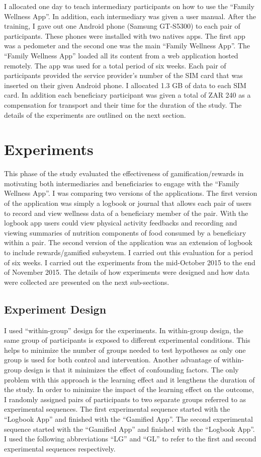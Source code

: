 I allocated one day to teach intermediary participants on how to use the ``Family Wellness App''. In addition, each intermediary was given a user manual. After the training, I gave out one Android phone (Samsung GT-S5300) to each pair of participants. These phones were installed with two natives apps. The first app was a pedometer and the second one was the main ``Family Wellness App''. The ``Family Wellness App'' loaded all its content from a web application hosted remotely. The app was used for a total period of six weeks. Each pair of participants provided the service provider's number of the SIM card that was inserted on their given Android phone. I allocated 1.3 GB of data to each SIM card. In addition each beneficiary participant was given a total of ZAR 240 as a compensation for transport and their time for the duration of the study. The details of the experiments are outlined on the next section.

\section{Experiments}
This phase of the study evaluated the effectiveness of gamification/rewards in motivating both intermediaries and beneficiaries to engage with the ``Family Wellness App''. I was comparing two versions of the applications. The first version of the application was simply a logbook or journal that allows each pair of users to record and view wellness data of a beneficiary member of the pair. With the logbook app users could view physical activity feedbacks and recording and viewing summaries of nutrition components of food consumed by a beneficiary within a pair. The second version of the application was an extension of logbook to include rewards/gamified subsystem. I carried out this evaluation for a period of six weeks. I carried out the experiments from the mid-October 2015 to the end of November 2015.  The details of how experiments were designed and how data were collected are presented on the next sub-sections.
\subsection{Experiment Design}
I used ``within-group'' design for the experiments. In within-group design, the same group of participants is exposed to different experimental conditions. This helps to minimize the number of groups needed to test hypotheses as only one group is used for both control and intervention. Another advantage of within-group design is that it minimizes the effect of confounding factors. The only problem with this approach is the learning effect and it lengthens the duration of the study. In order to minimize the impact of the learning effect on the outcome, I randomly assigned pairs of participants to two separate groups referred to as experimental sequences. The first experimental sequence started with the ``Logbook App''  and finished with the ``Gamified App''. The second experimental sequence started with the ``Gamified App'' and finished with the ``Logbook App''. I used the following abbreviations ``LG'' and ``GL'' to refer to the first and second experimental sequences respectively.

